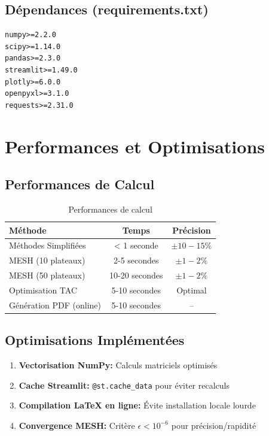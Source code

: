 \documentclass[11pt,a4paper]{article}
\begin{document}
\subsection{Dépendances (requirements.txt)}

\begin{lstlisting}
numpy>=2.2.0
scipy>=1.14.0
pandas>=2.3.0
streamlit>=1.49.0
plotly>=6.0.0
openpyxl>=3.1.0
requests>=2.31.0
\end{lstlisting}

\section{Performances et Optimisations}

\subsection{Performances de Calcul}

\begin{table}[h]
\centering
\begin{tabular}{lcc}
\toprule
\textbf{Méthode} & \textbf{Temps} & \textbf{Précision} \\
\midrule
Méthodes Simplifiées & < 1 seconde & $\pm 10-15\%$ \\
MESH (10 plateaux) & 2-5 secondes & $\pm 1-2\%$ \\
MESH (50 plateaux) & 10-20 secondes & $\pm 1-2\%$ \\
Optimisation TAC & 5-10 secondes & Optimal \\
Génération PDF (online) & 5-10 secondes & -- \\
\bottomrule
\end{tabular}
\caption{Performances de calcul}
\end{table}

\subsection{Optimisations Implémentées}

\begin{enumerate}
\item \textbf{Vectorisation NumPy:} Calculs matriciels optimisés
\item \textbf{Cache Streamlit:} \texttt{@st.cache\_data} pour éviter recalculs
\item \textbf{Compilation LaTeX en ligne:} Évite installation locale lourde
\item \textbf{Convergence MESH:} Critère $\epsilon < 10^{-6}$ pour précision/rapidité
\end{enumerate}
\end{document}
